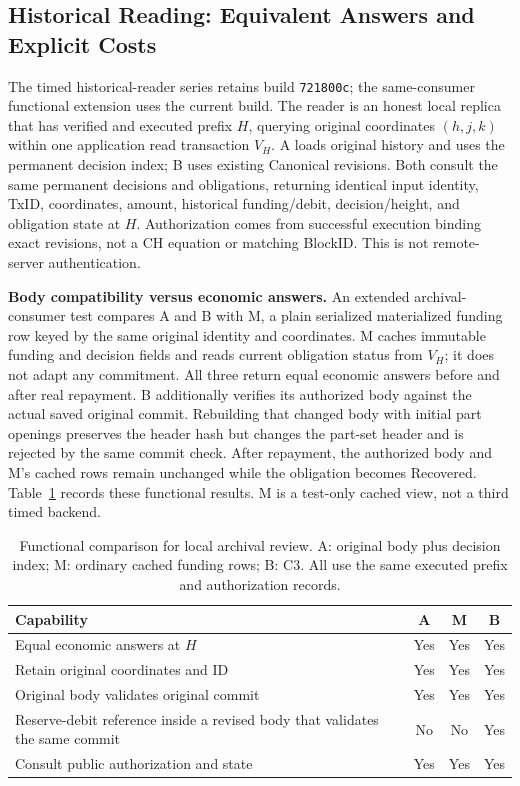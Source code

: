 \subsection{Historical Reading: Equivalent Answers and Explicit Costs}
\label{sec:eval-reader}

The timed historical-reader series retains build \texttt{721800c}; the same-consumer functional extension uses the current build. The reader is an honest local replica that has verified and executed
prefix $H$, querying original coordinates $(h,j,k)$ within one
application read transaction $V_H$. A loads original history and uses
the permanent decision index; B uses existing Canonical revisions.
Both consult the same permanent decisions and obligations, returning
identical input identity, TxID, coordinates, amount, historical
funding/debit, decision/height, and obligation state at $H$.
Authorization comes from successful execution binding exact revisions,
not a CH equation or matching BlockID. This is not remote-server
authentication.


\noindent\textbf{Body compatibility versus economic answers.}
An extended archival-consumer test compares A and B with M, a plain
serialized materialized funding row keyed by the same original identity
and coordinates. M caches immutable funding and decision fields and reads
current obligation status from $V_H$; it does not adapt any commitment.
All three return equal economic answers before and after real repayment.
B additionally verifies its authorized body against the actual saved
original commit. Rebuilding that changed body with initial part openings
preserves the header hash but changes the part-set header and is rejected
by the same commit check. After repayment, the authorized body and M's
cached rows remain unchanged while the obligation becomes Recovered.
Table~\ref{tab:c3-function} records these functional results. M is a
test-only cached view, not a third timed backend.

\begin{table}[t]
  \centering
  \caption{Functional comparison for local archival review. A: original
    body plus decision index; M: ordinary cached funding rows; B: C3.
    All use the same executed prefix and authorization records.}
  \label{tab:c3-function}
  \small
  \begin{tabular}{@{}p{}ccc@{}}
    \toprule
    Capability & A & M & B \\
    \midrule
    Equal economic answers at $H$ & Yes & Yes & Yes \\
    Retain original coordinates and ID & Yes & Yes & Yes \\
    Original body validates original commit & Yes & Yes & Yes \\
    Reserve-debit reference inside a revised body that validates the same commit & No & No & Yes \\
    Consult public authorization and state & Yes & Yes & Yes \\
    \bottomrule
  \end{tabular}
\end{table}

